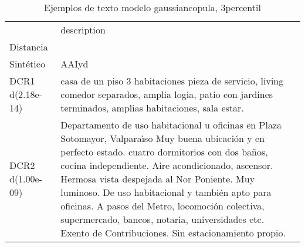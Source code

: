 \begin{table}[H]
\centering
\fontsize{10}{14}\selectfont
\caption{Ejemplos de texto modelo gaussiancopula, 3percentil}
\label{table-example-economicos-b-2-gaussiancopula-3p-text}
\begin{tabular}{|l|m{35em}|}
\hline
\rowcolor[gray]{0.8}
 & description \\
Distancia &  \\
\hline Sintético & AAIyd \\
\hline DCR1 d(2.18e-14) & casa de un piso 3 habitaciones pieza de servicio, living comedor separados, amplia logia, patio con jardines terminados, amplias habitaciones, sala estar. \\
\hline DCR2 d(1.00e-09) & Departamento de uso habitacional u oficinas en Plaza Sotomayor, Valpara{\'\i}so
Muy buena ubicaci\'on y en perfecto estado.
cuatro dormitorios con dos ba\~nos, cocina independiente.
Aire acondicionado, ascensor.
Hermosa vista despejada al Nor  Poniente. Muy luminoso. 
De uso habitacional y tambi\'en apto para oficinas. A pasos del Metro, locomoci\'on colectiva, supermercado, bancos, notaria, universidades etc.
Exento de Contribuciones.
Sin estacionamiento propio.
 \\
\hline
\end{tabular}
\end{table}
